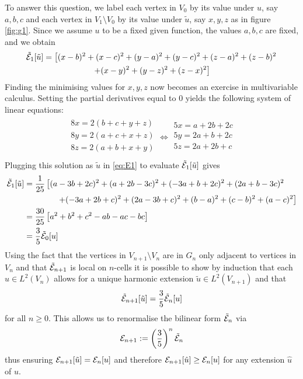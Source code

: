 To answer this question, we label each vertex in $V_0$ by its value under $u$, say $a,b,c$ and each vertex in $V_1\setminus V_0$ by its value under $\tilde u$, say $x,y,z$ as in figure \ref{fig:g1}. Since we assume $u$ to be a fixed given function, the values $a,b,c$ are fixed, and we obtain 
\begin{multline}\label{eq:E1}
  \tilde{\mathcal{E}}_1[\tilde u]=\left[(x-b)^2+(x-c)^2+(y-a)^2+(y-c)^2+(z-a)^2+(z-b)^2\right.\\
  \left.+(x-y)^2+(y-z)^2+(z-x)^2\right]
\end{multline}
Finding the minimising values for $x,y,z$ now becomes an exercise in multivariable calculus. Setting the partial derivatives equal to 0 yields the following system of linear equations:
\begin{align*}
  \begin{array}{c}
    8x=2(b+c+y+z)\\
    8y=2(a+c+x+z)\\
    8z=2(a+b+x+y)\\
  \end{array}\Longleftrightarrow
  \begin{array}{c}
    5x=a+2b+2c\\
    5y=2a+b+2c\\
    5z=2a+2b+c\\
  \end{array}
\end{align*}
Plugging this solution as $\tilde u$ in \eqref{eq:E1} to evaluate $\tilde{\mathcal{E}}_1[\tilde u]$ gives
\begin{align*}
  \tilde{\mathcal{E}}_1[\tilde u]
  &=\frac{1}{25}\left[(a-3b+2c)^2+(a+2b-3c)^2+(-3a+b+2c)^2
    +(2a+b-3c)^2\right.\\
  &\qquad\qquad \left.+(-3a+2b+c)^2+(2a-3b+c)^2
    +(b-a)^2+(c-b)^2+(a-c)^2\right]\\
  &=\frac{30}{25}\left[a^2+b^2+c^2-ab-ac-bc\right]\\
  &=\frac{3}{5}\tilde{\mathcal{E}}_0[u]
\end{align*}
Using the fact that the vertices in $V_{n+1}\setminus V_n$ are in $G_n$ only adjacent to vertices in $V_n$ and that 
$\tilde{\mathcal{E}}_{n+1}$ is local on $n$-cells it is possible to show by induction that each $u\in L^2(V_n)$ allows for a unique harmonic extension $\tilde u\in L^2(V_{n+1})$ and that 
\[
  \tilde{\mathcal{E}}_{n+1}[\tilde u]=\frac{3}{5}\tilde{\mathcal{E}}_n[u]
\]
for all $n\geq0$. This allows us to renormalise the bilinear form $\tilde{\mathcal{E}}_n$ via 
\[
  \mathcal{E}_{n+1}:=\left(\frac{3}{5}\right)^n\tilde{\mathcal{E}}_n
\]
thus ensuring $\mathcal{E}_{n+1}[\tilde u]=\mathcal{E}_n[u]$ and therefore
$\mathcal{E}_{n+1}[\hat u]\geq\mathcal{E}_n[u]$ for any extension $\hat u$ of $u$.

